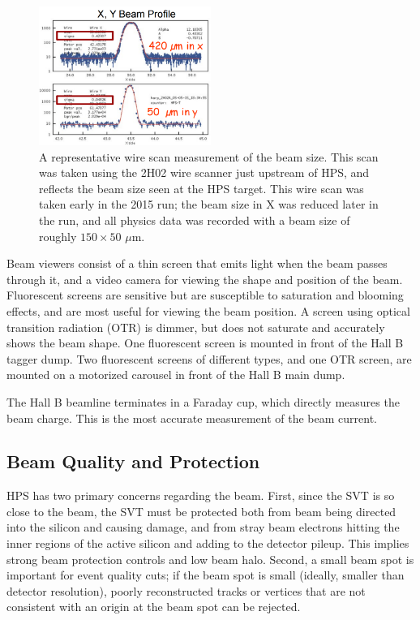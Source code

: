 \begin{figure}[htp]
    \begin{center}
        \includegraphics[width=0.5\textwidth]{detector/figs/beamsize}
    \end{center}
    \caption{A representative wire scan measurement of the beam size.
        This scan was taken using the 2H02 wire scanner just upstream of HPS, and reflects the beam size seen at the HPS target.
    This wire scan was taken early in the 2015 run; the beam size in X was reduced later in the run, and all physics data was recorded with a beam size of roughly $150\times 50$ $\mu$m.
    }
    \label{fig:beamsize}
\end{figure}

Beam viewers consist of a thin screen that emits light when the beam passes through it, and a video camera for viewing the shape and position of the beam.
Fluorescent screens are sensitive but are susceptible to saturation and blooming effects, and are most useful for viewing the beam position.
A screen using optical transition radiation (OTR) is dimmer, but does not saturate and accurately shows the beam shape.
One fluorescent screen is mounted in front of the Hall B tagger dump.
Two fluorescent screens of different types, and one OTR screen, are mounted on a motorized carousel in front of the Hall B main dump.

The Hall B beamline terminates in a Faraday cup, which directly measures the beam charge.
This is the most accurate measurement of the beam current.

\subsection{Beam Quality and Protection}
\label{sec:beam_quality}
HPS has two primary concerns regarding the beam.
First, since the SVT is so close to the beam, the SVT must be protected both from beam being directed into the silicon and causing damage, and from stray beam electrons hitting the inner regions of the active silicon and adding to the detector pileup.
This implies strong beam protection controls and low beam halo.
Second, a small beam spot is important for event quality cuts; if the beam spot is small (ideally, smaller than detector resolution), poorly reconstructed tracks or vertices that are not consistent with an origin at the beam spot can be rejected.


